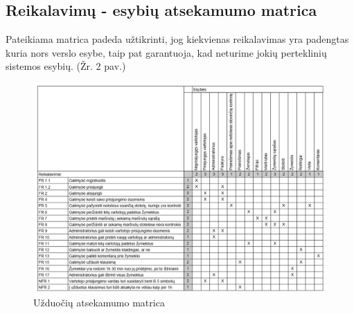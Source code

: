 \documentclass{VUMIFPSkursinis}
\begin{document}
\subsection{Reikalavimų - esybių atsekamumo matrica}
Pateikiama matrica padeda užtikrinti, jog kiekvienas reikalavimas yra padengtas kuria nors verslo esybe, taip pat garantuoja, kad neturime jokių perteklinių sistemos esybių. (Žr. 2 pav.)
	\begin{figure}[H]
				\centering
				\includegraphics[scale=0.4]{img/uzduociu_matrica}
				\caption{Užduočių atsekamumo matrica}
				\label{img:matrix}
			\end{figure}
\end{document}
